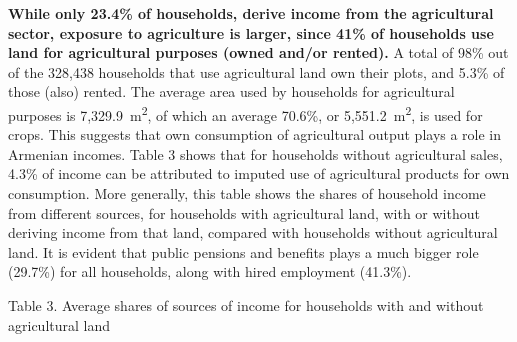 \documentclass[
  letterpaper,
  DIV=11,
  numbers=noendperiod]{scrartcl}
\begin{document}
\textbf{While only 23.4\% of households, derive income from the
agricultural sector, exposure to agriculture is larger, since 41\% of
households use land for agricultural purposes (owned and/or rented).} A
total of 98\% out of the 328,438 households that use agricultural land
own their plots, and 5.3\% of those (also) rented. The average area used
by households for agricultural purposes is 7,329.9~m\textsuperscript{2},
of which an average 70.6\%, or 5,551.2~m\textsuperscript{2}, is used for
crops. This suggests that own consumption of agricultural output plays a
role in Armenian incomes. Table 3 shows that for households without
agricultural sales, 4.3\% of income can be attributed to imputed use of
agricultural products for own consumption. More generally, this table
shows the shares of household income from different sources, for
households with agricultural land, with or without deriving income from
that land, compared with households without agricultural land. It is
evident that public pensions and benefits plays a much bigger role
(29.7\%) for all households, along with hired employment (41.3\%).

\label{_Ref156594885}{}Table 3. Average shares of sources
of income for households with and without agricultural land
\end{document}
